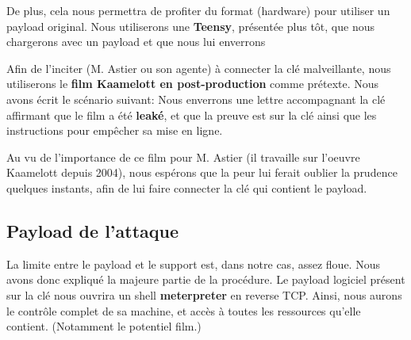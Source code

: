 De plus, cela nous permettra de profiter du format (hardware) pour utiliser un payload original. Nous utiliserons une \textbf{Teensy}, présentée plus tôt, que nous chargerons avec un payload et que nous lui enverrons

Afin de l'inciter (M. Astier ou son agente) à connecter la clé malveillante, nous utiliserons le \textbf{film Kaamelott en post-production} comme prétexte. 
Nous avons écrit le scénario suivant: Nous enverrons une lettre accompagnant la clé affirmant que le film a été \textbf{leaké}, et que la preuve est sur la clé ainsi que les instructions pour empêcher sa mise en ligne.

Au vu de l'importance de ce film pour M. Astier (il travaille sur l'oeuvre Kaamelott depuis 2004), nous espérons que la peur lui ferait oublier la prudence quelques instants, afin de lui faire connecter la clé qui contient le payload.
\subsection{Payload de l'attaque}

La limite entre le payload et le support est, dans notre cas, assez floue. Nous avons donc expliqué la majeure partie de la procédure.
Le payload logiciel présent sur la clé nous ouvrira un shell \textbf{meterpreter} en reverse TCP. Ainsi, nous aurons le contrôle complet de sa machine, et accès à toutes les ressources qu'elle contient. (Notamment le potentiel film.)
